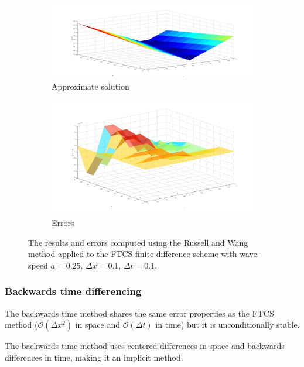 \begin{figure}[p]
    \centering
    \begin{subfigure}[b]{0.95\textwidth}
        \includegraphics[width=\textwidth]{diagrams/AdvectionResultsRW}
        \caption{Approximate solution}
    \end{subfigure}
    \begin{subfigure}[b]{0.95\textwidth}
        \includegraphics[width=\textwidth]{diagrams/AdvectionErrorRW}
        \caption{Errors}
    \end{subfigure}
    \caption{The results and errors computed using the Russell and Wang method applied to the FTCS finite difference scheme with wave-speed $a = 0.25$, $\Delta x = 0.1$, $\Delta t = 0.1$.}
    \label{RWFD}
\end{figure}

\subsubsection{Backwards time differencing}

The backwards time method shares the same error properties as the FTCS method ($\mathcal{O}(\Delta x^2)$ in space and $\mathcal{O}(\Delta t)$ in time) but it is unconditionally stable.

The backwards time method uses centered differences in space and backwards differences in time, making it an implicit method.

